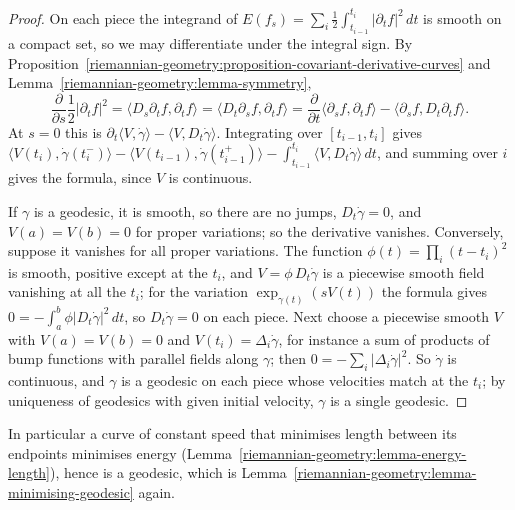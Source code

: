\begin{proof}
On each piece the integrand of $E(f_s) = \sum_i\frac12\int_{t_{i-1}}^{t_i}|\partial_tf|^2\,dt$ is smooth on a compact set, so we may differentiate under the integral sign.
By Proposition~\ref{riemannian-geometry:proposition-covariant-derivative-curves} and Lemma~\ref{riemannian-geometry:lemma-symmetry},
\[
\frac{\partial}{\partial s}\frac12|\partial_tf|^2 = \langle D_s\partial_tf, \partial_tf\rangle = \langle D_t\partial_sf, \partial_tf\rangle
= \frac{\partial}{\partial t}\langle\partial_sf, \partial_tf\rangle - \langle\partial_sf, D_t\partial_tf\rangle .
\]
At $s = 0$ this is $\partial_t\langle V, \dot\gamma\rangle - \langle V, D_t\dot\gamma\rangle$. Integrating over $[t_{i-1}, t_i]$ gives
$\langle V(t_i), \dot\gamma(t_i^-)\rangle - \langle V(t_{i-1}), \dot\gamma(t_{i-1}^+)\rangle - \int_{t_{i-1}}^{t_i}\langle V, D_t\dot\gamma\rangle\,dt$, and summing over $i$ gives the
formula, since $V$ is continuous.

If $\gamma$ is a geodesic, it is smooth, so there are no jumps, $D_t\dot\gamma = 0$, and $V(a) = V(b) = 0$ for proper variations; so the derivative vanishes. Conversely,
suppose it vanishes for all proper variations. The function $\phi(t) = \prod_i(t - t_i)^2$ is smooth, positive except at the $t_i$, and $V = \phi\,D_t\dot\gamma$ is a
piecewise smooth field vanishing at all the $t_i$; for the variation $\exp_{\gamma(t)}(sV(t))$ the formula gives $0 = -\int_a^b\phi|D_t\dot\gamma|^2\,dt$, so $D_t\dot\gamma = 0$ on
each piece. Next choose a piecewise smooth $V$ with $V(a) = V(b) = 0$ and $V(t_i) = \Delta_i\dot\gamma$, for instance a sum of products of bump functions with parallel
fields along $\gamma$; then $0 = -\sum_i|\Delta_i\dot\gamma|^2$. So $\dot\gamma$ is continuous, and $\gamma$ is a geodesic on each piece whose velocities match at the $t_i$; by
uniqueness of geodesics with given initial velocity, $\gamma$ is a single geodesic.
\end{proof}

In particular a curve of constant speed that minimises length between its endpoints minimises energy (Lemma~\ref{riemannian-geometry:lemma-energy-length}), hence is a
geodesic, which is Lemma~\ref{riemannian-geometry:lemma-minimising-geodesic} again.

